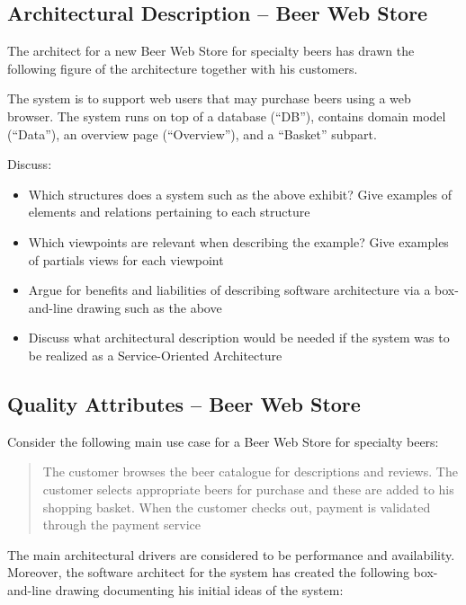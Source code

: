 \newpage
\subsection{Architectural Description -- Beer Web Store}
The architect for a new Beer Web Store for specialty beers has drawn
the following figure of the architecture together with his customers.
\begin{figure}[h!]
  \centerline{}
\end{figure}
The system is to support web users that may purchase beers using a web
browser. The system runs on top of a database (``DB''), contains
domain model (``Data''), an overview page (``Overview''), and a
``Basket'' subpart.

Discuss:
\begin{itemize}
    \item Which structures does a system such as the above exhibit?
    Give examples of elements and relations pertaining to each
    structure
    \item Which viewpoints are relevant when describing the example?
    Give examples of partials views for each viewpoint
    \item Argue for benefits and liabilities of describing software
    architecture via a box-and-line drawing such as the above
    \item Discuss what architectural description would be needed if
    the system was to be realized as a Service-Oriented Architecture
\end{itemize}


\newpage
\subsection{Quality Attributes -- Beer Web Store}

Consider the following main use case for a Beer Web Store for specialty
beers:

\begin{quote}
  The customer browses the beer catalogue for descriptions and
  reviews. The customer selects appropriate beers for purchase and
  these are added to his shopping basket. When the customer checks
  out, payment is validated through the payment service
\end{quote}
The main architectural drivers are considered to be performance and
availability. Moreover, the software architect for the system has
created the following box-and-line drawing documenting his initial
ideas of the system:
\begin{figure}[h!]
  \centerline{}
\end{figure}


